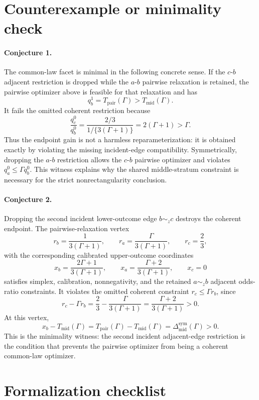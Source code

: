 \documentclass[11pt]{article}
\theoremstyle{definition}
\theoremstyle{plain}
\theoremstyle{remark}
\begin{document}
\section{Counterexample or minimality check}
\paragraph{Conjecture 1.}
The common-law facet is minimal in the following concrete sense.  If the \(c\)-\(b\) adjacent restriction is dropped while the \(a\)-\(b\) pairwise relaxation is retained, the pairwise optimizer above is feasible for that relaxation and has
\[
  q_b^1=T_{\mathrm{pair}}(\Gamma)>T_{\mathrm{mid}}(\Gamma).
\]
It fails the omitted coherent restriction because
\[
  \frac{q_c^0}{q_b^0}
  =
  \frac{2/3}{1/\{3(\Gamma+1)\}}
  =
  2(\Gamma+1)>\Gamma.
\]
Thus the endpoint gain is not a harmless reparameterization: it is obtained exactly by violating the missing incident-edge compatibility.  Symmetrically, dropping the \(a\)-\(b\) restriction allows the \(c\)-\(b\) pairwise optimizer and violates \(q_a^0\le \Gamma q_b^0\).  This witness explains why the shared middle-stratum constraint is necessary for the strict nonrectangularity conclusion.

\paragraph{Conjecture 2.}
Dropping the second incident lower-outcome edge \(b\sim_z c\) destroys the coherent endpoint.  The pairwise-relaxation vertex
\[
  r_b=\frac{1}{3(\Gamma+1)},\qquad
  r_a=\frac{\Gamma}{3(\Gamma+1)},\qquad
  r_c=\frac23,
\]
with the corresponding calibrated upper-outcome coordinates
\[
  x_b=\frac{2\Gamma+1}{3(\Gamma+1)},\qquad
  x_a=\frac{\Gamma+2}{3(\Gamma+1)},\qquad
  x_c=0
\]
satisfies simplex, calibration, nonnegativity, and the retained \(a\sim_z b\) adjacent odds-ratio constraints.  It violates the omitted coherent constraint \(r_c\le\Gamma r_b\), since
\[
  r_c-\Gamma r_b
  =
  \frac23-\frac{\Gamma}{3(\Gamma+1)}
  =
  \frac{\Gamma+2}{3(\Gamma+1)}
  >0.
\]
At this vertex,
\[
  x_b-T_{\mathrm{mid}}(\Gamma)
  =
  T_{\mathrm{pair}}(\Gamma)-T_{\mathrm{mid}}(\Gamma)
  =
  \Delta_{\mathrm{mid}}^{\mathrm{sym}}(\Gamma)>0.
\]
This is the minimality witness: the second incident adjacent-edge restriction is the condition that prevents the pairwise optimizer from being a coherent common-law optimizer.

\section{Formalization checklist}
\end{document}
